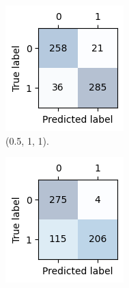 \documentclass{article}
\begin{document}
\begin{figure}[ht]
    \centering
    \begin{subfigure}[b]{0.18\textwidth}
        \centering
        \includegraphics[width=\textwidth]{images/confusion_matrix_5_1_1.png}
        \caption{(0.5, 1, 1).}
    \end{subfigure}
    \hfill
    \begin{subfigure}[b]{0.18\textwidth}
        \centering
        \includegraphics[width=\textwidth]{images/confusion_matrix_1_1_1.png}

\end{subfigure}
\end{figure}
\end{document}

